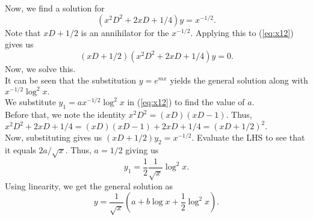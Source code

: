 \documentclass{article}
\begin{document}
\begin{enumerate}[label = Q.\arabic*.]
\begin{enumerate}[start = 3, label = (\roman*)]
		Now, we find a solution for
		\begin{equation} \label{eq:x12}
			(x^2D^2 + 2xD + 1/4)y = x^{-1/2}.
		\end{equation}
		Note that $xD+1/2$ is an annihilator for the $x^{-1/2}.$ Applying this to (\ref{eq:x12}) gives us
		\begin{equation*} 
			(xD + 1/2)(x^2D^2 + 2xD + 1/4)y = 0.
		\end{equation*}
		Now, we solve this. \\
		It can be seen that the substitution $y = e^{mx}$ yields the general solution along with $x^{-1/2}\log^2 x.$\\
		We substitute $y_1 = ax^{-1/2}\log^2 x$ in (\ref{eq:x12}) to find the value of $a.$\\
		Before that, we note the identity $x^2D^2 = (xD)(xD - 1).$ Thus, $x^2D^2 + 2xD + 1/4 = (xD)(xD - 1) + 2xD + 1/4 = (xD + 1/2)^2.$\\
		Now, substituting gives us $(xD + 1/2)y_2 = x^{-1/2}.$ Evaluate the LHS to see that it equals $2a/\sqrt{x}.$ Thus, $a = 1/2$ giving us 
		\begin{equation}
			y_1 = \dfrac{1}{2}\frac{1}{\sqrt{x}}\log^2x.
		\end{equation}
		Using linearity, we get the general solution as
		\[y = \frac{1}{\sqrt{x}}\left(a + b\log x + \frac{1}{2}\log^2x\right).\]


\end{enumerate}
\end{enumerate}
\end{document}
